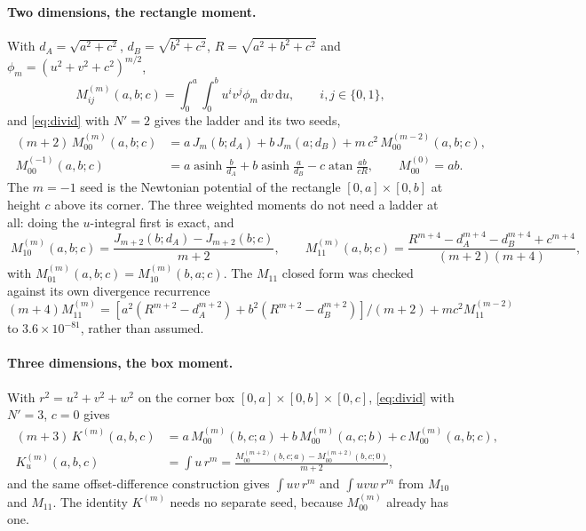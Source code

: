 \documentclass[11pt]{article}
\theoremstyle{remark}
\newcommand{\dd}{\mathrm{d}}
\newcommand{\asinh}{\operatorname{asinh}}
\newcommand{\atan}{\operatorname{atan}}
\begin{document}
\paragraph{Two dimensions, the rectangle moment.} With
$d_A = \sqrt{a^2+c^2}$, $d_B = \sqrt{b^2+c^2}$, $R = \sqrt{a^2+b^2+c^2}$ and
$\phi_m = (u^2+v^2+c^2)^{m/2}$,
\begin{equation}
M_{ij}^{(m)}(a,b;c) = \int_0^a\!\!\int_0^b u^i v^j \phi_m\,\dd v\,\dd u,
\qquad i,j\in\{0,1\},
\end{equation}
and \eqref{eq:divid} with $N' = 2$ gives the ladder and its two seeds,
\begin{equation}
\boxed{\;
\begin{aligned}
(m+2)\,M_{00}^{(m)}(a,b;c) &= a\,J_m(b;d_A) + b\,J_m(a;d_B) + m\,c^2\,M_{00}^{(m-2)}(a,b;c),\\
M_{00}^{(-1)}(a,b;c) &= a\asinh\frac{b}{d_A} + b\asinh\frac{a}{d_B} - c\atan\frac{ab}{cR},
\qquad M_{00}^{(0)} = ab .
\end{aligned}\;}
\label{eq:M00}
\end{equation}
The $m = -1$ seed is the Newtonian potential of the rectangle $[0,a]\times[0,b]$ at height
$c$ above its corner. The three weighted moments do not need a ladder at all: doing the
$u$-integral first is exact, and
\begin{equation}
\boxed{\;
M_{10}^{(m)}(a,b;c) = \frac{J_{m+2}(b;d_A) - J_{m+2}(b;c)}{m+2},\qquad
M_{11}^{(m)}(a,b;c) = \frac{R^{m+4} - d_A^{m+4} - d_B^{m+4} + c^{m+4}}{(m+2)(m+4)},\;}
\label{eq:M1011}
\end{equation}
with $M_{01}^{(m)}(a,b;c) = M_{10}^{(m)}(b,a;c)$. The $M_{11}$ closed form was checked
against its own divergence recurrence
$(m+4)M_{11}^{(m)} = [a^2(R^{m+2}-d_A^{m+2}) + b^2(R^{m+2}-d_B^{m+2})]/(m+2) + m c^2 M_{11}^{(m-2)}$
to $3.6\times10^{-81}$, rather than assumed.

\paragraph{Three dimensions, the box moment.} With $r^2 = u^2+v^2+w^2$ on the corner box
$[0,a]\times[0,b]\times[0,c]$, \eqref{eq:divid} with $N' = 3$, $c = 0$ gives
\begin{equation}
\boxed{\;
\begin{aligned}
(m+3)\,K^{(m)}(a,b,c) &= a\,M_{00}^{(m)}(b,c;a) + b\,M_{00}^{(m)}(a,c;b) + c\,M_{00}^{(m)}(a,b;c),\\
K_u^{(m)}(a,b,c) &= \int u\,r^m = \frac{M_{00}^{(m+2)}(b,c;a) - M_{00}^{(m+2)}(b,c;0)}{m+2},
\end{aligned}\;}
\label{eq:K}
\end{equation}
and the same offset-difference construction gives $\int uv\,r^m$ and $\int uvw\,r^m$ from
$M_{10}$ and $M_{11}$. The identity $K^{(m)}$ needs no separate seed, because
$M_{00}^{(m)}$ already has one.
\end{document}
